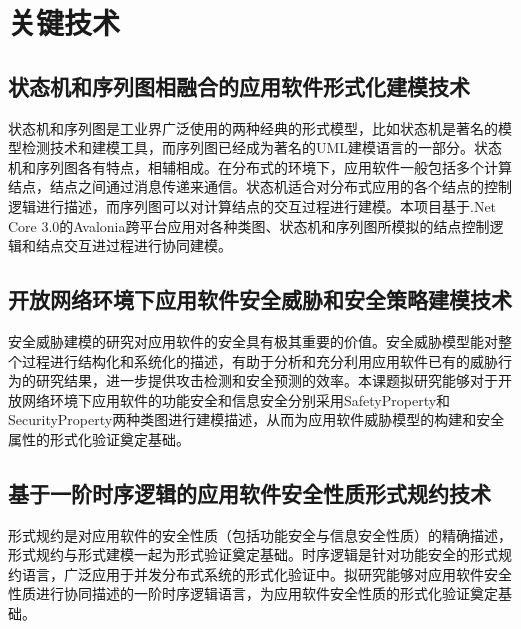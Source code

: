 \chapter{关键技术}
\section{状态机和序列图相融合的应用软件形式化建模技术}
状态机和序列图是工业界广泛使用的两种经典的形式模型，比如状态机是著名的模型检测技术和建模工具，而序列图已经成为著名的UML建模语言的一部分。状态机和序列图各有特点，相辅相成。在分布式的环境下，应用软件一般包括多个计算结点，结点之间通过消息传递来通信。状态机适合对分布式应用的各个结点的控制逻辑进行描述，而序列图可以对计算结点的交互过程进行建模。本项目基于.Net Core 3.0的Avalonia跨平台应用对各种类图、状态机和序列图所模拟的结点控制逻辑和结点交互进过程进行协同建模。
\section{开放网络环境下应用软件安全威胁和安全策略建模技术}
安全威胁建模的研究对应用软件的安全具有极其重要的价值。安全威胁模型能对整个过程进行结构化和系统化的描述，有助于分析和充分利用应用软件已有的威胁行为的研究结果，进一步提供攻击检测和安全预测的效率。本课题拟研究能够对于开放网络环境下应用软件的功能安全和信息安全分别采用SafetyProperty和SecurityProperty两种类图进行建模描述，从而为应用软件威胁模型的构建和安全属性的形式化验证奠定基础。
\section{基于一阶时序逻辑的应用软件安全性质形式规约技术}
形式规约是对应用软件的安全性质（包括功能安全与信息安全性质）的精确描述，形式规约与形式建模一起为形式验证奠定基础。时序逻辑是针对功能安全的形式规约语言，广泛应用于并发分布式系统的形式化验证中。拟研究能够对应用软件安全性质进行协同描述的一阶时序逻辑语言，为应用软件安全性质的形式化验证奠定基础。
